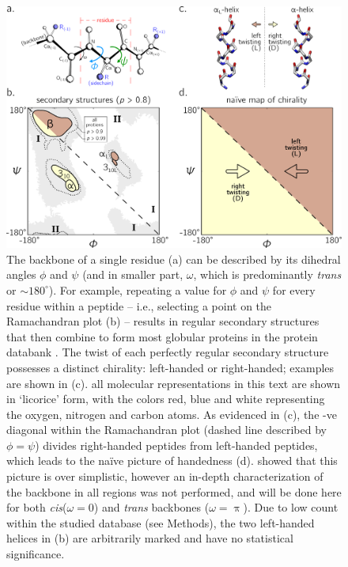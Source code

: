 \documentclass[fleqn,10pt,lineno]{wlpeerj} %
\newcommand{\n}[1]{{\color{blue}#1}}
\newcommand{\cis}{{\em cis}\xspace}
\newcommand{\trans}{{\em trans}\xspace}
\begin{document}
\begin{figure}[t!]
\centering
\includegraphics[width=0.8\linewidth]{./figures/chirality_intro.pdf}
\caption{\label{fig:intro} 
\n{The backbone of a single residue (a) can be described by its dihedral angles $\phi$ and $\psi$} (and in smaller part, $\omega$, which is predominantly \trans or $\sim 180^\circ$). For example, repeating a value for $\phi$ and $\psi$ for every residue within a peptide -- i.e., selecting a point on the Ramachandran plot (b) -- results in regular secondary structures that then combine to form most globular proteins in the protein databank \citep{Berman2000}. The twist of each perfectly regular secondary structure possesses a distinct chirality: left-handed or right-handed; examples are shown in (c). \n{all molecular representations in this text are shown in `licorice' form, with the colors red, blue and white representing the oxygen, nitrogen and carbon atoms.} As evidenced in (c), the -ve diagonal within the Ramachandran plot (dashed line described by $\phi=\psi$) divides right-handed peptides from left-handed peptides, which leads to the na{\"i}ve picture of handedness (d). \cite{Zacharias2013} showed that this picture is over simplistic, however an in-depth characterization of the backbone in all regions was not performed, and will be done here for both \cis ($\omega=0$) and \trans backbones ($\omega=\uppi$). Due to low count within the studied database (see Methods), the two left-handed helices in (b) are arbitrarily marked and have no statistical significance.}
\end{figure}
\end{document}
